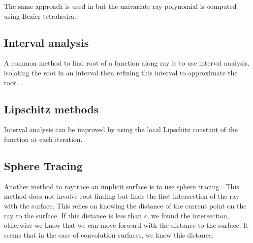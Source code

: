\documentclass[11pt]{article}
\numberwithin{figure}{section}
\begin{document}
The same approach is used in \cite{Loop:2006:RGR:1179352.1141939} but the univariate ray polynomial is computed using Bezier tetrahedra.

\subsection{Interval analysis}

A common method to find root of a function along ray is to use interval analysis, isolating the root in an interval then refining this interval to approximate the root. \cite{Mitchell:1990:RRI:93267.93276}.

\subsection{Lipschitz methods}

Interval analysis can be improved by using the local Lipschitz constant of the function at each iteration.

\subsection{Sphere Tracing}

Another method to raytrace an implicit surface is to use sphere tracing \cite{springerlink:10.1007/s003710050084}. 
This method does not involve root finding but finds the first intersection of the ray with the surface.
This relies on knowing the distance of the current point on the ray to the surface. If this distance is less than $\epsilon$, we found the intersection, otherwise we know that we can move forward with the distance to the surface. It seems that in the case of convolution surfaces, we know this distance.

\clearpage

 

\end{document}
